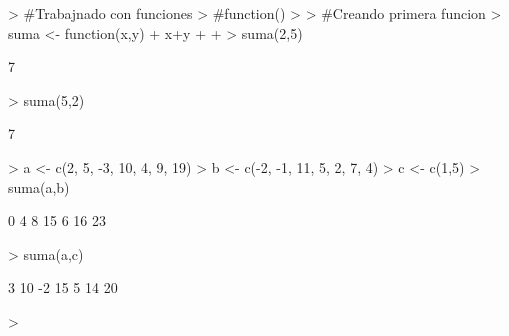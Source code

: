\documentclass{article}
\begin{document}


\begin{Schunk}
\begin{Sinput}
> #Trabajnado con funciones 
> #function(){}
> 
> #Creando primera funcion 
> suma <- function(x,y){
+   x+y
+   
+ }
> suma(2,5)
\end{Sinput}
\begin{Soutput}
[1] 7
\end{Soutput}
\begin{Sinput}
> suma(5,2)
\end{Sinput}
\begin{Soutput}
[1] 7
\end{Soutput}
\begin{Sinput}
> a <- c(2, 5, -3, 10, 4, 9, 19)
> b <- c(-2, -1, 11, 5, 2, 7, 4)
> c <- c(1,5)
> suma(a,b)
\end{Sinput}
\begin{Soutput}
[1]  0  4  8 15  6 16 23
\end{Soutput}
\begin{Sinput}
> suma(a,c)
\end{Sinput}
\begin{Soutput}
[1]  3 10 -2 15  5 14 20
\end{Soutput}
\begin{Sinput}
> 
\end{Sinput}
\end{Schunk}
\end{document}
